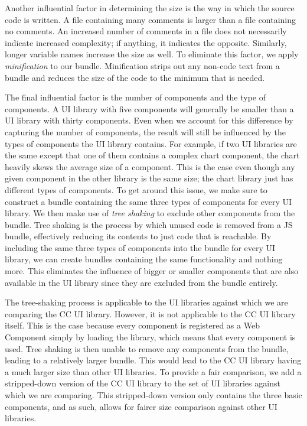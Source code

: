 Another influential factor in determining the size is the way in which the source code is written. A file containing many comments is larger than a file containing no comments. An increased number of comments in a file does not necessarily indicate increased complexity; if anything, it indicates the opposite. Similarly, longer variable names increase the size as well. To eliminate this factor, we apply \emph{minification} to our bundle. Minification strips out any non-code text from a bundle and reduces the size of the code to the minimum that is needed.

The final influential factor is the number of components and the type of components. A UI library with five components will generally be smaller than a UI library with thirty components. Even when we account for this difference by capturing the number of components, the result will still be influenced by the types of components the UI library contains. For example, if two UI libraries are the same except that one of them contains a complex chart component, the chart heavily skews the average size of a component. This is the case even though any given component in the other library is the same size; the chart library just has different types of components. To get around this issue, we make sure to construct a bundle containing the same three types of components for every UI library. We then make use of \emph{tree shaking} to exclude other components from the bundle. Tree shaking is the process by which unused code is removed from a JS bundle, effectively reducing its contents to just code that is reachable. By including the same three types of components into the bundle for every UI library, we can create bundles containing the same functionality and nothing more. This eliminates the influence of bigger or smaller components that are also available in the UI library since they are excluded from the bundle entirely.

The tree-shaking process is applicable to the UI libraries against which we are comparing the CC UI library. However, it is not applicable to the CC UI library itself. This is the case because every component is registered as a Web Component simply by loading the library, which means that every component is used. Tree shaking is then unable to remove any components from the bundle, leading to a relatively larger bundle. This would lead to the CC UI library having a much larger size than other UI libraries. To provide a fair comparison, we add a stripped-down version of the CC UI library to the set of UI libraries against which we are comparing. This stripped-down version only contains the three basic components, and as such, allows for fairer size comparison against other UI libraries.


